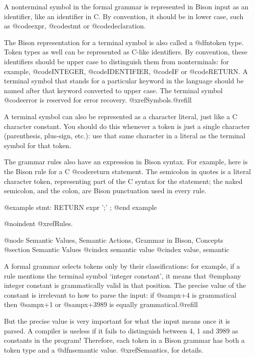 A nonterminal symbol in the formal grammar is represented in Bison input
as an identifier, like an identifier in C.  By convention, it should be
in lower case, such as @code{expr}, @code{stmt} or @code{declaration}.

The Bison representation for a terminal symbol is also called a @dfn{token
type}.  Token types as well can be represented as C-like identifiers.  By
convention, these identifiers should be upper case to distinguish them from
nonterminals: for example, @code{INTEGER}, @code{IDENTIFIER}, @code{IF} or
@code{RETURN}.  A terminal symbol that stands for a particular keyword in
the language should be named after that keyword converted to upper case.
The terminal symbol @code{error} is reserved for error recovery.
@xref{Symbols}.@refill

A terminal symbol can also be represented as a character literal, just like
a C character constant.  You should do this whenever a token is just a
single character (parenthesis, plus-sign, etc.): use that same character in
a literal as the terminal symbol for that token.

The grammar rules also have an expression in Bison syntax.  For example,
here is the Bison rule for a C @code{return} statement.  The semicolon in
quotes is a literal character token, representing part of the C syntax for
the statement; the naked semicolon, and the colon, are Bison punctuation
used in every rule.

@example
stmt:   RETURN expr ';'
        ;
@end example

@noindent
@xref{Rules}.

@node Semantic Values, Semantic Actions, Grammar in Bison, Concepts
@section Semantic Values
@cindex semantic value
@cindex value, semantic

A formal grammar selects tokens only by their classifications: for example,
if a rule mentions the terminal symbol `integer constant', it means that
@emph{any} integer constant is grammatically valid in that position.  The
precise value of the constant is irrelevant to how to parse the input: if
@samp{x+4} is grammatical then @samp{x+1} or @samp{x+3989} is equally
grammatical.@refill

But the precise value is very important for what the input means once it is
parsed.  A compiler is useless if it fails to distinguish between 4, 1 and
3989 as constants in the program!  Therefore, each token in a Bison grammar
has both a token type and a @dfn{semantic value}.  @xref{Semantics},
for details.

